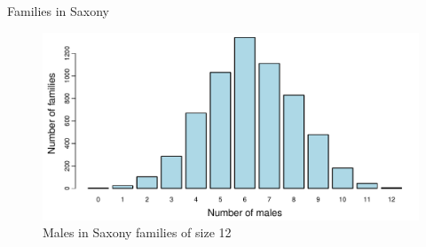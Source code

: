 \documentclass[11pt]{book}
\renewenvironment{knitrout}{\small\renewcommand{\baselinestretch}{.85}}{} %
\begin{document}
\begin{Example}[saxony1]{Families in Saxony}
\begin{knitrout}
\begin{figure}[!htbp]
\centerline{\includegraphics[width=.75\textwidth]{ch03/fig/saxony-barplot} }

\caption[Males in Saxony families of size 12]{Males in Saxony families of size 12\label{fig:saxony-barplot}}
\end{figure}


\end{knitrout}
\end{Example}
\end{document}
